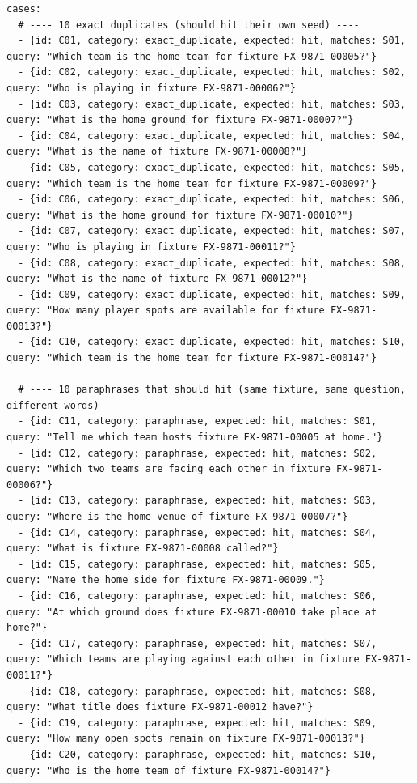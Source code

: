 \documentclass[11pt]{article}
\begin{document}
\begin{lstlisting}
cases:
  # ---- 10 exact duplicates (should hit their own seed) ----
  - {id: C01, category: exact_duplicate, expected: hit, matches: S01, query: "Which team is the home team for fixture FX-9871-00005?"}
  - {id: C02, category: exact_duplicate, expected: hit, matches: S02, query: "Who is playing in fixture FX-9871-00006?"}
  - {id: C03, category: exact_duplicate, expected: hit, matches: S03, query: "What is the home ground for fixture FX-9871-00007?"}
  - {id: C04, category: exact_duplicate, expected: hit, matches: S04, query: "What is the name of fixture FX-9871-00008?"}
  - {id: C05, category: exact_duplicate, expected: hit, matches: S05, query: "Which team is the home team for fixture FX-9871-00009?"}
  - {id: C06, category: exact_duplicate, expected: hit, matches: S06, query: "What is the home ground for fixture FX-9871-00010?"}
  - {id: C07, category: exact_duplicate, expected: hit, matches: S07, query: "Who is playing in fixture FX-9871-00011?"}
  - {id: C08, category: exact_duplicate, expected: hit, matches: S08, query: "What is the name of fixture FX-9871-00012?"}
  - {id: C09, category: exact_duplicate, expected: hit, matches: S09, query: "How many player spots are available for fixture FX-9871-00013?"}
  - {id: C10, category: exact_duplicate, expected: hit, matches: S10, query: "Which team is the home team for fixture FX-9871-00014?"}

  # ---- 10 paraphrases that should hit (same fixture, same question, different words) ----
  - {id: C11, category: paraphrase, expected: hit, matches: S01, query: "Tell me which team hosts fixture FX-9871-00005 at home."}
  - {id: C12, category: paraphrase, expected: hit, matches: S02, query: "Which two teams are facing each other in fixture FX-9871-00006?"}
  - {id: C13, category: paraphrase, expected: hit, matches: S03, query: "Where is the home venue of fixture FX-9871-00007?"}
  - {id: C14, category: paraphrase, expected: hit, matches: S04, query: "What is fixture FX-9871-00008 called?"}
  - {id: C15, category: paraphrase, expected: hit, matches: S05, query: "Name the home side for fixture FX-9871-00009."}
  - {id: C16, category: paraphrase, expected: hit, matches: S06, query: "At which ground does fixture FX-9871-00010 take place at home?"}
  - {id: C17, category: paraphrase, expected: hit, matches: S07, query: "Which teams are playing against each other in fixture FX-9871-00011?"}
  - {id: C18, category: paraphrase, expected: hit, matches: S08, query: "What title does fixture FX-9871-00012 have?"}
  - {id: C19, category: paraphrase, expected: hit, matches: S09, query: "How many open spots remain on fixture FX-9871-00013?"}
  - {id: C20, category: paraphrase, expected: hit, matches: S10, query: "Who is the home team of fixture FX-9871-00014?"}


\end{lstlisting}
\end{document}
